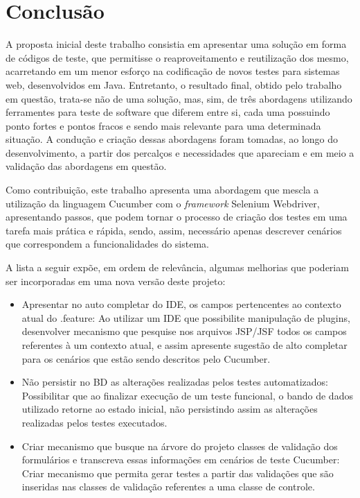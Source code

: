 \documentclass[tg]{mdtufsm}
\begin{document}
\chapter{Conclusão}
A proposta inicial deste trabalho consistia em apresentar uma solução em forma de códigos de teste, que permitisse o reaproveitamento e reutilização dos mesmo, acarretando em um menor esforço na codificação de novos testes para sistemas web, desenvolvidos em Java. Entretanto, o resultado final, obtido pelo trabalho em questão, trata-se não de uma solução, mas, sim, de três abordagens utilizando ferramentes para teste de software que diferem entre si, cada uma possuindo ponto fortes e pontos fracos e sendo mais relevante para uma determinada situação. A condução e criação dessas abordagens foram tomadas, ao longo do desenvolvimento, a partir dos percalços e necessidades que apareciam e em meio a validação das abordagens em questão.

Como contribuição, este trabalho apresenta uma abordagem que mescla a utilização da linguagem Cucumber com o \emph{framework} Selenium Webdriver, apresentando passos, que podem tornar o processo de criação dos testes em uma tarefa mais prática e rápida, sendo, assim, necessário apenas descrever cenários que correspondem a funcionalidades do sistema.

A lista a seguir expõe, em ordem de relevância, algumas melhorias que poderiam ser incorporadas em uma nova versão deste projeto:

\begin{itemize}
	\item Apresentar no auto completar do IDE, os campos pertencentes ao contexto atual do .feature: Ao utilizar um IDE que possibilite manipulação de plugins, desenvolver mecanismo que pesquise nos arquivos JSP/JSF todos os campos referentes à um contexto atual, e assim apresente sugestão de alto completar para os cenários que estão sendo descritos pelo Cucumber.
	\item Não persistir no BD as alterações realizadas pelos testes automatizados: Possibilitar que ao finalizar execução de um teste funcional, o bando de dados utilizado retorne ao estado inicial, não persistindo assim as alterações realizadas pelos testes executados.
	\item Criar mecanismo que busque na árvore do projeto classes de validação dos formulários e transcreva essas informações em cenários de teste Cucumber: Criar mecanismo que permita gerar testes a partir das validações que são inseridas nas classes de validação referentes a uma classe de controle.
\end{itemize}

\setlength{\baselineskip}{\baselineskip}


\end{document}
